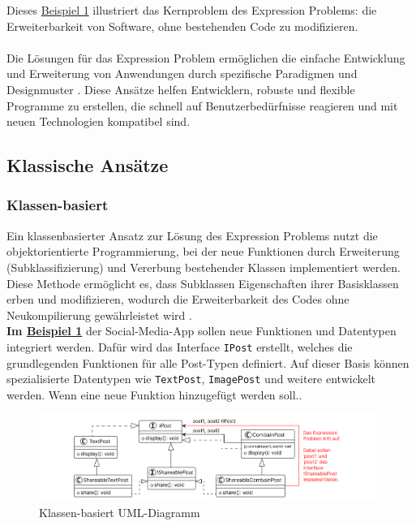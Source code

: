 \documentclass{easychair}
\begin{document}
  Dieses \hyperlink{beispiel1}{Beispiel 1} illustriert das Kernproblem des Expression Problems: die Erweiterbarkeit von Software, ohne bestehenden Code zu modifizieren.\\\\
  Die Lösungen für das Expression Problem ermöglichen die einfache Entwicklung und Erweiterung von Anwendungen durch spezifische Paradigmen und Designmuster \cite{wadler1998expression}. Diese Ansätze helfen Entwicklern, robuste und flexible Programme zu erstellen, die schnell auf Benutzerbedürfnisse reagieren und mit neuen Technologien kompatibel sind.


\subsection{Klassische Ansätze}
    \subsubsection{Klassen-basiert}
    Ein klassenbasierter Ansatz zur Lösung des Expression Problems nutzt die objektorientierte Programmierung, bei der neue Funktionen durch Erweiterung (Subklassifizierung) und Vererbung bestehender Klassen implementiert werden. Diese Methode ermöglicht es, dass Subklassen Eigenschaften ihrer Basisklassen erben und modifizieren, wodurch die Erweiterbarkeit des Codes ohne Neukompilierung gewährleistet wird \cite{gamma1994design}.\\

    \textbf{Im \hyperlink{beispiel1}{Beispiel 1}} der Social-Media-App sollen neue Funktionen und Datentypen integriert werden. Dafür wird das Interface \texttt{IPost} erstellt, welches die grundlegenden Funktionen für alle Post-Typen definiert. Auf dieser Basis können spezialisierte Datentypen wie \texttt{TextPost}, \texttt{ImagePost} und weitere entwickelt werden. Wenn eine neue Funktion hinzugefügt werden soll..
    
    \begin{figure}[H]
      \begin{center}
        \includegraphics[width=0.98\textwidth]{Klassen-basiert.png}
        \caption{Klassen-basiert UML-Diagramm}
        \label{fig:KB}
      \end{center}
  \end{figure}
\end{document}
